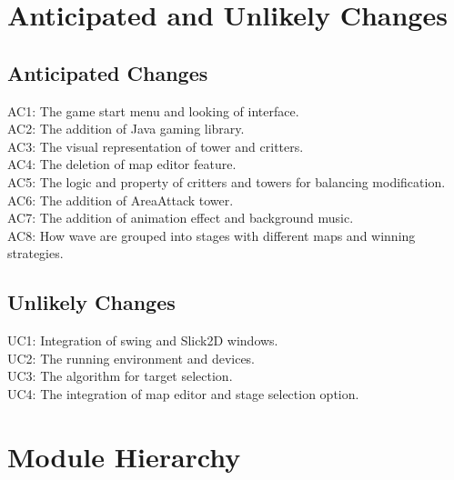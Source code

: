 \documentclass[12,english]{article}
\begin{document}
\section{Anticipated and Unlikely Changes}

\subsection{Anticipated Changes}

AC1: The game start menu and looking of interface.\\
AC2: The addition of Java gaming library.\\
AC3: The visual representation of tower and critters.\\
AC4: The deletion of map editor feature.\\
AC5: The logic and property of critters and towers for balancing modification.\\
AC6: The addition of AreaAttack tower.\\
AC7: The addition of animation effect and background music.\\
AC8: How wave are grouped into stages with different maps and winning strategies.\\

\subsection{Unlikely Changes}

UC1: Integration of swing and Slick2D windows.\\
UC2: The running environment and devices.\\
UC3: The algorithm for target selection.\\
UC4: The integration of map editor and stage selection option.

\section{Module Hierarchy}
\end{document}
